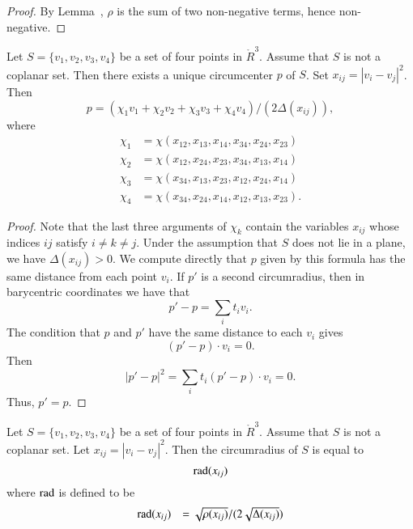 \begin{proof} By Lemma~,
$\rho$ is the sum of two non-negative terms, hence
non-negative.
\end{proof}

\newpage

\begin{lemma}
Let $S=\{v_1,v_2,v_3,v_4\}$ be a set of four points in $\ring{R}^3$.
Assume that $S$ is not a coplanar set.  
Then there exists a unique circumcenter $p$
of $S$.  Set $x_{ij} = |v_i-v_j|^2$.
Then 
    $$
    p = (\chi_1 v_1 + \chi_2 v_2 + \chi_3 v_3 + \chi_4
    v_4)/(2\Delta(x_{ij})),
    $$
where
    $$
    \begin{array}{lll}
    \chi_1 &= \chi(x_{12},x_{13},x_{14},x_{34},x_{24},x_{23})\\
    \chi_2 &= \chi(x_{12},x_{24},x_{23},x_{34},x_{13},x_{14})\\
    \chi_3 &= \chi(x_{34},x_{13},x_{23},x_{12},x_{24},x_{14})\\
    \chi_4 &= \chi(x_{34},x_{24},x_{14},x_{12},x_{13},x_{23}).
    \end{array}
    $$
\end{lemma}


\begin{proof}
Note that the last three arguments of $\chi_k$ 
contain the variables $x_{ij}$ whose
indices $ij$ satisfy $i\ne k\ne j$.
Under the assumption that $S$ does not lie
in a plane, we have $\Delta(x_{ij})>0$. 
We compute directly that $p$ given by this
formula has the same distance from each point
$v_i$.  If $p'$ is a second circumradius, then in 
barycentric coordinates we have that
  $$p'-p = \sum_i t_i v_i.$$
The condition that $p$ and $p'$ have the same distance to each $v_i$
gives
  $$(p'-p)\cdot v_i=0.$$
Then $$|p'-p|^2 = \sum_it_i (p'-p)\cdot v_i = 0.$$  
Thus, $p'=p$.
\end{proof}
\newpage


\begin{lemma}
Let $S=\{v_1,v_2,v_3,v_4\}$ be a set of four points in $\ring{R}^3$.
Assume that $S$ is not a coplanar set.  
Let $x_{ij}=|v_i-v_j|^2$.
Then the circumradius of
	$S$ is equal to 
	$$\operatorname{rad}(x_{ij})$$
where  $\operatorname{rad}$ is defined to be
		$$
		\begin{array}{lll}
		\operatorname{rad}(x_{ij})&=
		\sqrt{\rho(x_{ij})}/
		(2\sqrt{\Delta(x_{ij})})\\
		\end{array}
		$$
\end{lemma}

